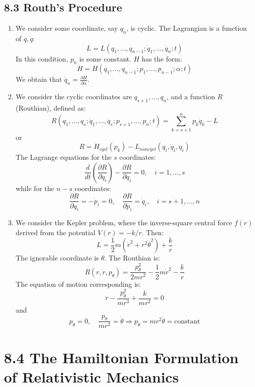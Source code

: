 \documentclass[12pt]{article}
\begin{document}
	\subsection*{8.3 Routh's Procedure}
	\begin{enumerate}
		\item We consider some coordinate, say $q_n$, is cyclic. The Lagrangian is a function of $q, \dot{q}$:
		\[ L = L(q_1, \dots, q_{n-1}; \dot{q}_1, \dots, \dot{q}_n; t) \]
		In this condition, $p_n$ is some constant. $H$ has the form:
		\[ H = H(q_1, \dots, q_{n-1}; p_1, \dots, p_{n-1}; \alpha; t) \]
		We obtain that $\dot{q}_n = \frac{\partial H}{\partial \alpha}$.
		
		\item We consider the cyclic coordinates are $q_{s+1}, \dots, q_n$, and a function $R$ (Routhian), defined as:
		\[ R(q_1, \dots, q_s; \dot{q}_1, \dots, \dot{q}_s; p_{s+1}, \dots, p_n; t) = \sum_{k=s+1}^n p_k \dot{q}_k - L \]
		or
		\[ R = H_{cycl} (p_k) - L_{noncycl} (q_i, \dot{q}_i, \ddot{q}_i) \]
		The Lagrange equations for the $s$ coordinates:
		\[ \frac{d}{dt}\left(\frac{\partial R}{\partial \dot{q}_i}\right) - \frac{\partial R}{\partial q_i} = 0, \quad i=1, \dots, s \]
		while for the $n-s$ coordinates:
		\[ \frac{\partial R}{\partial q_i} = -\dot{p}_i = 0, \quad \frac{\partial R}{\partial p_i} = \dot{q}_i, \quad i=s+1, \dots, n \]
		
		\item We consider the Kepler problem, where the inverse-square central force $f(r)$ derived from the potential $V(r) = -k/r$.
		Then:
		\[ L = \frac{1}{2}m(\dot{r}^2 + r^2\dot{\theta}^2) + \frac{k}{r} \]
		The ignorable coordinate is $\theta$. The Routhian is:
		\[ R(r, \dot{r}, p_\theta) = \frac{p_\theta^2}{2mr^2} - \frac{1}{2}m\dot{r}^2 - \frac{k}{r} \]
		The equation of motion corresponding is:
		\[ \ddot{r} - \frac{p_\theta^2}{mr^3} + \frac{k}{mr^2} = 0 \]
		and
		\[ p_\theta = 0, \quad \frac{p_\theta}{mr^2} = \dot{\theta} \Rightarrow p_\theta = mr^2\dot{\theta} = \text{constant} \]
	\end{enumerate}
	\section*{8.4 The Hamiltonian Formulation of Relativistic Mechanics}
	
\end{document}
